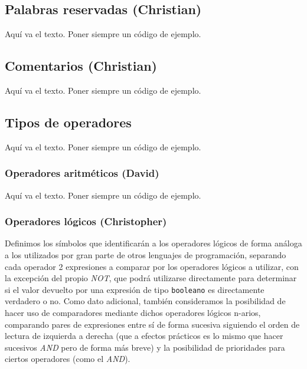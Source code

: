 \documentclass[11pt, english]{article}
\begin{document}
\subsection{Palabras reservadas (Christian)}\label{keywords}
Aquí va el texto. Poner siempre un código de ejemplo.
\newpage

\subsection{Comentarios (Christian)}\label{commentaries}
Aquí va el texto. Poner siempre un código de ejemplo.
\newpage

\subsection{Tipos de operadores}\label{operators}
Aquí va el texto. Poner siempre un código de ejemplo.

\subsubsection{Operadores aritméticos (David)}\label{arithmetic-operators}
Aquí va el texto. Poner siempre un código de ejemplo.
\newpage

\subsubsection{Operadores lógicos (Christopher)}
Definimos los símbolos que identificarán a los operadores lógicos de forma análoga a los utilizados por gran parte de otros lenguajes de programación, separando cada operador 2 expresiones a comparar por los operadores lógicos a utilizar, con la excepción del propio \emph{NOT}, que podrá utilizarse directamente para determinar si el valor devuelto por una expresión de tipo \texttt{booleano} es directamente verdadero o no. Como dato adicional, también consideramos la posibilidad de hacer uso de comparadores mediante dichos operadores lógicos n-arios, comparando pares de expresiones entre sí de forma sucesiva siguiendo el orden de lectura de izquierda a derecha (que a efectos prácticos es lo mismo que hacer sucesivos \emph{AND} pero de forma más breve) y la posibilidad de prioridades para ciertos operadores (como el \emph{AND}). \vspace{0px}
\end{document}
